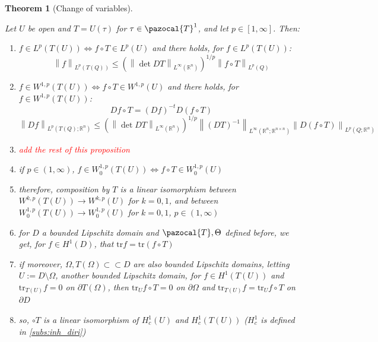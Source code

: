 \documentclass[english,a4paper,12pt,oneside]{scrbook}
\theoremstyle{break}
\newtheorem{thm}[equation]{Theorem}
\theoremstyle{remark}
\newcommand{\mR}{\mathbb{R}}
\newcommand{\norm}[1]{\left\lVert#1\right\rVert}
\newcommand{\tr}{\text{tr}}
\newcommand{\cc}{\subset\subset}
\newcommand{\cT}{\pazocal{T}}
\newcommand{\Te}{\Theta}
\newcommand{\tred}[1]{\textcolor{red}{#1}}
\begin{document}
\begin{thm}[Change of variables]
\label{thm:change}

Let $U$ be open and $T = U(\tau)$ for $\tau \in \cT^1$, and let $p \in [ 1,\infty]$. Then:

\begin{enumerate}
	\item $f \in L^p(T(U)) \iff f\circ T \in L^p(U)$ and there holds, for $f \in L^p(T(U))$:
	$$ \norm{f}_{L^p(T(Q))}\leq \left ( \norm{\det DT}_{L^\infty(\mR^n)}\right)^{1/p} \norm{f\circ T}_{L^p(Q)}$$
	\item $f \in W^{1,p}(T(U)) \iff f\circ T \in W^{1,p}(U)$ and there holds, for $f\in W^{1,p}(T(U))$:
	$$Df \circ T = (Df)^{-t}D(f\circ T)$$
	$$ \norm{Df}_{L^p(T(Q);\mR^n)}\leq \left ( \norm{\det DT}_{L^\infty(\mR^n)}\right)^{1/p} \norm{(DT)^{-1}}_{L^\infty(\mR^n;\mR^{n\times n})}\norm{D(f\circ T)}_{L^p(Q;\mR^n)}$$
	\item \tred{add the rest of this proposition}
	\item if $p \in (1, \infty)$, $f \in W^{1,p}_0(T(U)) \iff f\circ T \in W^{1,p}_0(U)$
	\item therefore, composition by $T$ is a linear isomorphism between $W^{k,p}(T(U))\rightarrow W^{k,p}(U)$ for $k=0,1$, and between $W^{1,p}_0(T(U))\rightarrow W^{1,p}_0(U)$ for $k=0,1$, $p \in (1, \infty)$
	\item for $D$ a bounded Lipschitz domain and $\cT, \Te$ defined before, we get, for $f \in H^1(D)$, that $\tr f = \tr(f\circ T)$
	\item if moreover, $\Omega, T(\Omega) \cc D$ are also bounded Lipschitz domains, letting $U:=D\setminus \Omega$, another bounded Lipschitz domain, for $f \in H^1(T(U))$ and $\tr_{T(U)} f =0 $ on $ \partial T(\Omega) $, then $\tr_{U} f\circ T=0$ on $\partial \Omega$ and $\tr_{T(U)} f = \tr_{U} f\circ T$ on $\partial D$
	\item so, $\circ T$ is a linear isomorphism of $H^1_c(U)$ and $H^1_c(T(U))$ ($H^1_c$ is defined in \cref{subs:inh_diri})
\end{enumerate}

\end{thm}
\end{document}
